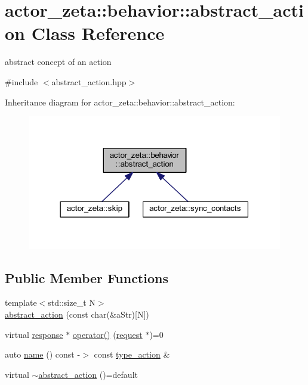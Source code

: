 \hypertarget{classactor__zeta_1_1behavior_1_1abstract__action}{}\section{actor\+\_\+zeta\+:\+:behavior\+:\+:abstract\+\_\+action Class Reference}
\label{classactor__zeta_1_1behavior_1_1abstract__action}


abstract concept of an action  




{\ttfamily \#include $<$abstract\+\_\+action.\+hpp$>$}



Inheritance diagram for actor\+\_\+zeta\+:\+:behavior\+:\+:abstract\+\_\+action\+:\nopagebreak
\begin{figure}[H]
\begin{center}
\leavevmode
\includegraphics[width=316pt]{classactor__zeta_1_1behavior_1_1abstract__action__inherit__graph}
\end{center}
\end{figure}
\subsection*{Public Member Functions}
\begin{DoxyCompactItemize}
\item 
{\footnotesize template$<$std\+::size\+\_\+t N$>$ }\\\hyperlink{classactor__zeta_1_1behavior_1_1abstract__action_a510b0faad0820c2bfc66c8c17bb5c302}{abstract\+\_\+action} (const char(\&a\+Str)\mbox{[}N\mbox{]})
\item 
virtual \hyperlink{classactor__zeta_1_1behavior_1_1response}{response} $\ast$ \hyperlink{classactor__zeta_1_1behavior_1_1abstract__action_a5e48075d77fbd93615fc9b757e6a4d87}{operator()} (\hyperlink{classactor__zeta_1_1behavior_1_1request}{request} $\ast$)=0
\item 
auto \hyperlink{classactor__zeta_1_1behavior_1_1abstract__action_aa01dde89f5f3bc0a5b31e73eb5b38737}{name} () const -\/$>$ const \hyperlink{classactor__zeta_1_1behavior_1_1type__action}{type\+\_\+action} \&
\item 
virtual \hyperlink{classactor__zeta_1_1behavior_1_1abstract__action_a0a138630b650422e1e769a0ae10a681f}{$\sim$abstract\+\_\+action} ()=default
\end{DoxyCompactItemize}


